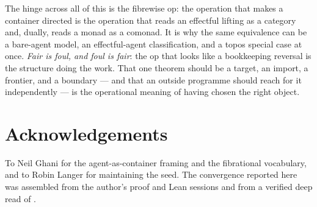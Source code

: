 \documentclass[11pt]{amsart}
\theoremstyle{plain}
\theoremstyle{definition}
\begin{document}
The hinge across all of this is the fibrewise op: the operation that makes a container directed is
the operation that reads an effectful lifting as a category and, dually, reads a monad as a
comonad. It is why the same equivalence can be a bare-agent model, an effectful-agent
classification, and a topos special case at once. \emph{Fair is foul, and foul is fair}: the
op that looks like a bookkeeping reversal is the structure doing the work. That one theorem should
be a target, an import, a frontier, and a boundary --- and that an outside programme should reach
for it independently --- is the operational meaning of having chosen the right object.

\section*{Acknowledgements}
To Neil Ghani for the agent-as-container framing and the fibrational vocabulary, and to Robin
Langer for maintaining the seed. The convergence reported here was assembled from the author's
proof and Lean sessions and from a verified deep read of \cite{SmitheCAI2}.
\end{document}
